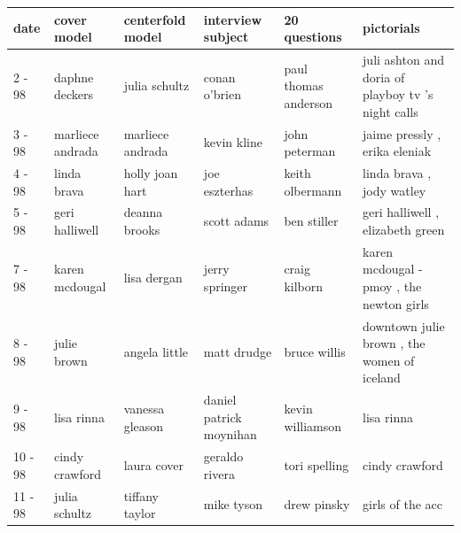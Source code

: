 \documentclass{article}
\begin{document}
\begin{tabular}{llllll}
\toprule
date & cover model & centerfold model & interview subject & 20 questions & pictorials \\
\midrule
2 - 98 & daphne deckers & julia schultz & conan o'brien & paul thomas anderson & juli ashton and doria of playboy tv 's night calls \\
3 - 98 & marliece andrada & marliece andrada & kevin kline & john peterman & jaime pressly , erika eleniak \\
4 - 98 & linda brava & holly joan hart & joe eszterhas & keith olbermann & linda brava , jody watley \\
5 - 98 & geri halliwell & deanna brooks & scott adams & ben stiller & geri halliwell , elizabeth green \\
7 - 98 & karen mcdougal & lisa dergan & jerry springer & craig kilborn & karen mcdougal - pmoy , the newton girls \\
8 - 98 & julie brown & angela little & matt drudge & bruce willis & downtown julie brown , the women of iceland \\
9 - 98 & lisa rinna & vanessa gleason & daniel patrick moynihan & kevin williamson & lisa rinna \\
10 - 98 & cindy crawford & laura cover & geraldo rivera & tori spelling & cindy crawford \\
11 - 98 & julia schultz & tiffany taylor & mike tyson & drew pinsky & girls of the acc \\
\bottomrule
\end{tabular}
\end{document}
